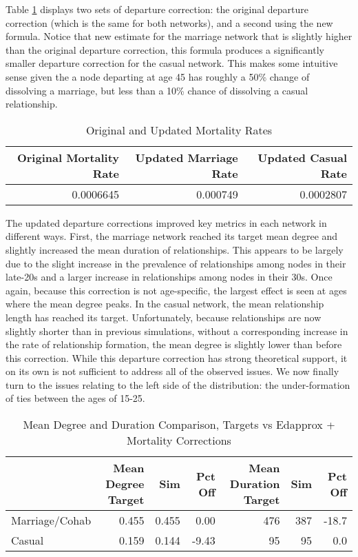 \documentclass [11pt, proquest] {uwthesis}[2015/03/03]
\begin{document}
Table \ref{tab:departure-tab} displays two sets of departure correction: the original departure correction (which is the same for both networks), and a second using the new formula. Notice that new estimate for the marriage network that is slightly higher than the original departure correction, this formula produces a significantly smaller departure correction for the casual network. This makes some intuitive sense given the a node departing at age 45 has roughly a 50\% change of dissolving a marriage, but less than a 10\% chance of dissolving a casual relationship.
\begin{table}

\caption{\label{tab:departure-tab}Original and Updated Mortality Rates}
\centering
\begin{tabular}[t]{rrr}
\toprule
Original Mortality Rate & Updated Marriage Rate & Updated Casual Rate\\
\midrule
0.0006645 & 0.000749 & 0.0002807\\
\bottomrule
\end{tabular}
\end{table}
The updated departure corrections improved key metrics in each network in different ways. First, the marriage network reached its target mean degree and slightly increased the mean duration of relationships. This appears to be largely due to the slight increase in the prevalence of relationships among nodes in their late-20s and a larger increase in relationships among nodes in their 30s. Once again, because this correction is not age-specific, the largest effect is seen at ages where the mean degree peaks. In the casual network, the mean relationship length has reached its target. Unfortunately, because relationships are now slightly shorter than in previous simulations, without a corresponding increase in the rate of relationship formation, the mean degree is slightly lower than before this correction. While this departure correction has strong theoretical support, it on its own is not sufficient to address all of the observed issues. We now finally turn to the issues relating to the left side of the distribution: the under-formation of ties between the ages of 15-25.
\begin{table}

\caption{\label{tab:scen5-tab}Mean Degree and Duration Comparison, Targets vs Edapprox + Mortality Corrections}
\centering
\begin{tabular}[t]{lrrrrrr}
\toprule
  & Mean Degree Target & Sim & Pct Off & Mean Duration Target & Sim & Pct Off\\
\midrule
Marriage/Cohab & 0.455 & 0.455 & 0.00 & 476 & 387 & -18.7\\
Casual & 0.159 & 0.144 & -9.43 & 95 & 95 & 0.0\\
\bottomrule
\end{tabular}
\end{table}
\end{document}
